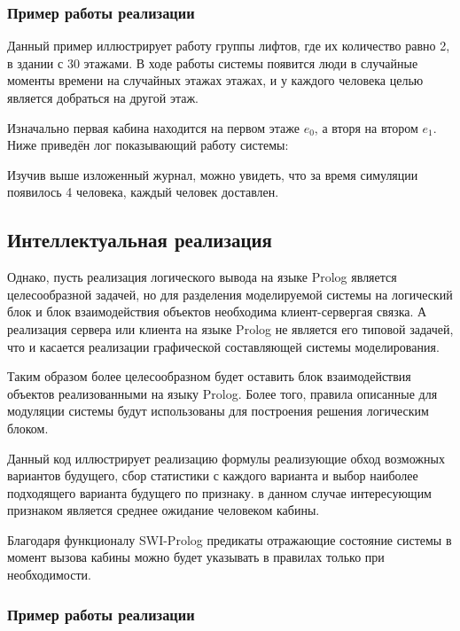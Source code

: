 				\subsubsection{Пример работы реализации}

			Данный пример иллюстрирует работу группы лифтов, где их количество равно 2, в здании с 30 этажами.
				В ходе работы системы появится люди в случайные моменты времени на случайных этажах этажах,
				и у каждого человека целью является добраться на другой этаж.

			Изначально первая кабина находится на первом этаже $e_0$, а вторя на втором $e_1$.
				Ниже приведён лог показывающий работу системы:

			Изучив выше изложенный журнал, можно увидеть, что за время симуляции появилось 4 человека,
				каждый человек доставлен.

		\subsection{Интеллектуальная реализация}

		Однако, пусть реализация логического вывода на языке Prolog является целесообразной задачей, но для разделения моделируемой системы на логический блок и блок взаимодействия объектов необходима клиент-сервергая связка. А реализация сервера или клиента на языке Prolog не является его типовой задачей, что и касается реализации графической составляющей системы моделирования.

			Таким образом более целесообразном будет оставить блок взаимодействия объектов реализованными на языку Prolog.
				Более того, правила описанные для модуляции системы будут использованы
				для построения решения логическим блоком.

			Данный код иллюстрирует реализацию формулы реализующие обход возможных вариантов будущего, сбор статистики с каждого варианта и выбор наиболее подходящего варианта будущего по признаку. в данном случае интересующим признаком является среднее ожидание человеком кабины. 

% 

	Благодаря функционалу SWI-Prolog
		предикаты отражающие состояние системы в момент вызова кабины можно будет указывать в правилах только при необходимости.

		\subsubsection{Пример работы реализации}

